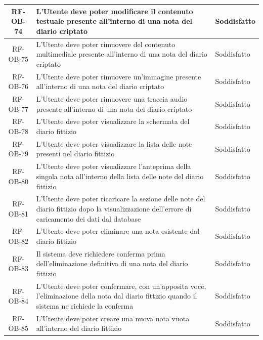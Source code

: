 \documentclass[a4paper,12pt]{article}
\begin{document}
\begin{center}
\begin{longtable}{|c|p{8.5cm}|>{\centering\arraybackslash}p{4cm}|}
RF-OB-74 & L'Utente deve poter modificare il contenuto testuale presente all'interno di una nota del diario criptato & Soddisfatto \\
\hline

RF-OB-75 & L'Utente deve poter rimuovere del contenuto multimediale presente all'interno di una nota del diario criptato & Soddisfatto \\
\hline

RF-OB-76 & L'Utente deve poter rimuovere un'immagine presente all'interno di una nota del diario criptato & Soddisfatto \\
\hline

RF-OB-77 & L'Utente deve poter rimuovere una traccia audio presente all'interno di una nota del diario criptato & Soddisfatto \\
\hline

RF-OB-78 & L'Utente deve poter visualizzare la schermata del diario fittizio & Soddisfatto \\
\hline

RF-OB-79 & L'Utente deve poter visualizzare la lista delle note presenti nel diario fittizio & Soddisfatto \\
\hline

RF-OB-80 & L'Utente deve poter visualizzare l'anteprima della singola nota all'interno della lista delle note del diario fittizio & Soddisfatto \\
\hline

RF-OB-81 & L'Utente deve poter ricaricare la sezione delle note del diario fittizio dopo la visualizzazione dell'errore di caricamento dei dati dal database & Soddisfatto \\
\hline

RF-OB-82 & L'Utente deve poter eliminare una nota esistente dal diario fittizio & Soddisfatto \\
\hline

RF-OB-83 & Il sistema deve richiedere conferma prima dell'eliminazione definitiva di una nota del diario fittizio & Soddisfatto \\
\hline

RF-OB-84 & L'Utente deve poter confermare, con un'apposita voce, l'eliminazione della nota dal diario fittizio quando il sistema ne richiede la conferma & Soddisfatto \\
\hline

RF-OB-85 & L'Utente deve poter creare una nuova nota vuota all'interno del diario fittizio & Soddisfatto \\
\hline


\end{longtable}
\end{center}
\end{document}
